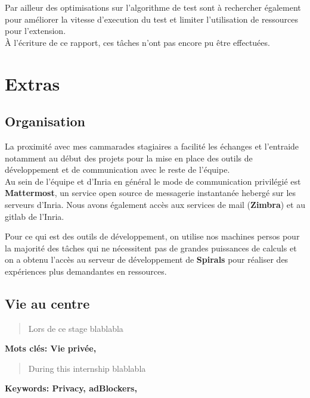 \documentclass[oneside,a4paper,12pt]{article}
\begin{document}
Par ailleur des optimisations sur l'algorithme de test sont à rechercher également pour améliorer la vitesse d'execution du test et limiter l'utilisation de ressources pour l'extension.\\

\`A l'écriture de ce rapport, ces tâches n'ont pas encore pu être effectuées.

\section{Extras}

\subsection{Organisation}

La proximité avec mes cammarades stagiaires a facilité les échanges et l'entraide notamment au début des projets pour la mise en place des outils de développement et de communication avec le reste de l'équipe.\\

Au sein de l'équipe et d'Inria en général le mode de communication privilégié est \textbf{Mattermost}, un service open source de messagerie instantanée hebergé sur les serveurs d'Inria. Nous avons également accès aux services de mail (\textbf{Zimbra}) et au gitlab de l'Inria.

Pour ce qui est des outils de développement, on utilise nos machines persos pour la majorité des tâches qui ne nécessitent pas de grandes puissances de calculs et on a obtenu l'accès au serveur de développement de \textbf{Spirals} pour réaliser des expériences plus demandantes en ressources.

\subsection{Vie au centre}



\newpage

\appendix
\printbibliography

\newpage

\begin{center}
	
	\vspace{2cm}
	\renewcommand{\abstractname}{Résumé}
	\begin{abstract}
	
	Lors de ce stage blablabla

	\end{abstract}
	\textbf{Mots clés: Vie privée, }
	\vspace{\fill}	
	\renewcommand{\abstractname}{Abstract}
	\begin{abstract}
	
	During this internship blablabla

	\end{abstract}
	\textbf{Keywords: Privacy, adBlockers, }
	\vspace{2cm}

\end{center}
\end{document}
